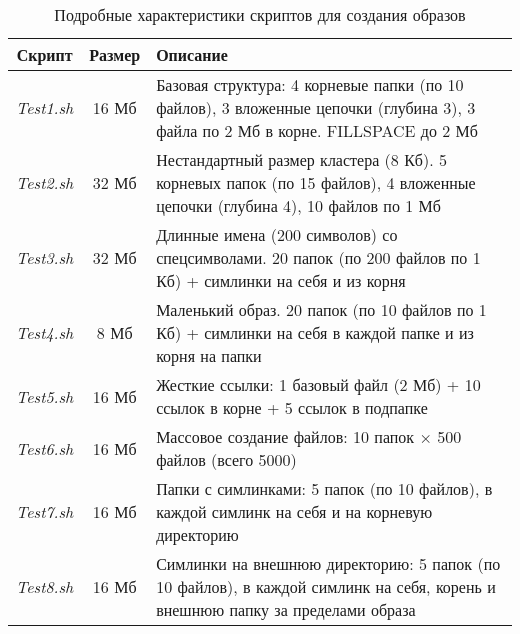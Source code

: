\begin{table}[htbp]
	\renewcommand{\arraystretch}{1.5}
	\centering
	\begin{tabular}{|c|c|p{10cm}|}
		\hline
		\textbf{Скрипт} & \textbf{Размер} & \textbf{Описание} \\
		\hline
		\textit{Test1.sh} & 16 Мб & Базовая структура: 4 корневые папки (по 10 файлов), 3 вложенные цепочки (глубина 3), 3 файла по 2 Мб в корне. FILLSPACE до 2 Мб \\
		\hline
		\textit{Test2.sh} & 32 Мб & Нестандартный размер кластера (8 Кб). 5 корневых папок (по 15 файлов), 4 вложенные цепочки (глубина 4), 10 файлов по 1 Мб\\
		\hline
		\textit{Test3.sh} & 32 Мб &Длинные имена (200 символов) со спецсимволами. 20 папок (по 200 файлов по 1 Кб) + симлинки на себя и из корня \\
		\hline
		\textit{Test4.sh} & 8 Мб & Маленький образ. 20 папок (по 10 файлов по 1 Кб) + симлинки на себя в каждой папке и из корня на папки\\
		\hline
		\textit{Test5.sh} & 16 Мб & Жесткие ссылки: 1 базовый файл (2 Мб) + 10 ссылок в корне + 5 ссылок в подпапке\\
		\hline
		\textit{Test6.sh} & 16 Мб & Массовое создание файлов: 10 папок × 500 файлов (всего 5000) \\
		\hline
		\textit{Test7.sh} & 16 Мб & Папки с симлинками: 5 папок (по 10 файлов), в каждой симлинк на себя и на корневую директорию\\
		\hline
		\textit{Test8.sh} & 16 Мб & Симлинки на внешнюю директорию: 5 папок (по 10 файлов), в каждой симлинк на себя, корень и внешнюю папку за пределами образа\\
		\hline
	\end{tabular}
		\caption{Подробные характеристики скриптов для создания образов}
	\label{ntfs:tab:test_detail}
\end{table}

\newpage
